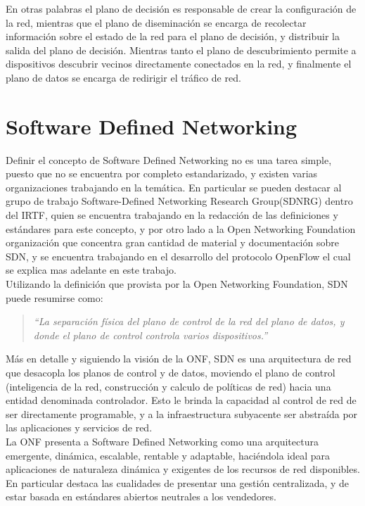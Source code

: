 En otras palabras el plano de decisión es responsable de crear la configuración de la red, mientras que el plano de diseminación se encarga de recolectar información sobre el estado de la red para el plano de decisión, y distribuir la salida del plano de decisión. Mientras tanto el plano de descubrimiento permite a dispositivos descubrir vecinos directamente conectados en la red, y finalmente el plano de datos se encarga de redirigir el tráfico de red.\\

\section{Software Defined Networking}

Definir el concepto de Software Defined Networking no es una tarea simple, puesto que no se encuentra por completo estandarizado, y existen varias organizaciones trabajando en la temática. En particular se pueden destacar al grupo de trabajo Software-Defined Networking Research Group(SDNRG) dentro del IRTF, quien se encuentra trabajando en la redacción de las definiciones y estándares para este concepto, y por otro lado a la Open Networking Foundation organización que concentra gran cantidad de material y documentación sobre SDN, y se encuentra trabajando en el desarrollo del protocolo OpenFlow el cual se explica mas adelante en este trabajo.\\

Utilizando la definición que provista por la Open Networking Foundation, SDN puede resumirse como:

\begin{quote}
\textit{``La separación física del plano de control de la red del plano de datos, y donde el plano de control controla varios dispositivos.''}
\end{quote}

Más en detalle y siguiendo la visión de la ONF, SDN es una arquitectura de red que desacopla los planos de control y de datos, moviendo el plano de control (inteligencia de la red, construcción y calculo de políticas de red) hacia una entidad denominada controlador. Esto le brinda la capacidad al control de red de ser directamente programable, y a la infraestructura subyacente ser abstraída por las aplicaciones y servicios de red.\\ 

La ONF presenta a Software Defined Networking como una arquitectura emergente, dinámica, escalable, rentable y adaptable, haciéndola ideal para aplicaciones de naturaleza dinámica y exigentes de los recursos de red disponibles. En particular destaca las cualidades de presentar una gestión centralizada, y de estar basada en estándares abiertos neutrales a los vendedores.\\


